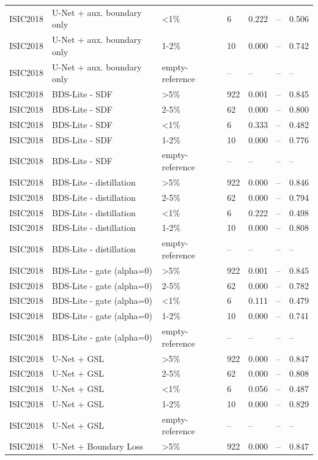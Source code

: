 \begin{longtable}{lllllll}
ISIC2018 & U-Net + aux. boundary only & <1\% & 6 & 0.222 & -- & 0.506 \\
ISIC2018 & U-Net + aux. boundary only & 1-2\% & 10 & 0.000 & -- & 0.742 \\
ISIC2018 & U-Net + aux. boundary only & empty-reference & -- & -- & -- & -- \\
ISIC2018 & BDS-Lite - SDF & >5\% & 922 & 0.001 & -- & 0.845 \\
ISIC2018 & BDS-Lite - SDF & 2-5\% & 62 & 0.000 & -- & 0.800 \\
ISIC2018 & BDS-Lite - SDF & <1\% & 6 & 0.333 & -- & 0.482 \\
ISIC2018 & BDS-Lite - SDF & 1-2\% & 10 & 0.000 & -- & 0.776 \\
ISIC2018 & BDS-Lite - SDF & empty-reference & -- & -- & -- & -- \\
ISIC2018 & BDS-Lite - distillation & >5\% & 922 & 0.000 & -- & 0.846 \\
ISIC2018 & BDS-Lite - distillation & 2-5\% & 62 & 0.000 & -- & 0.794 \\
ISIC2018 & BDS-Lite - distillation & <1\% & 6 & 0.222 & -- & 0.498 \\
ISIC2018 & BDS-Lite - distillation & 1-2\% & 10 & 0.000 & -- & 0.808 \\
ISIC2018 & BDS-Lite - distillation & empty-reference & -- & -- & -- & -- \\
ISIC2018 & BDS-Lite - gate (alpha=0) & >5\% & 922 & 0.001 & -- & 0.845 \\
ISIC2018 & BDS-Lite - gate (alpha=0) & 2-5\% & 62 & 0.000 & -- & 0.782 \\
ISIC2018 & BDS-Lite - gate (alpha=0) & <1\% & 6 & 0.111 & -- & 0.479 \\
ISIC2018 & BDS-Lite - gate (alpha=0) & 1-2\% & 10 & 0.000 & -- & 0.741 \\
ISIC2018 & BDS-Lite - gate (alpha=0) & empty-reference & -- & -- & -- & -- \\
ISIC2018 & U-Net + GSL & >5\% & 922 & 0.000 & -- & 0.847 \\
ISIC2018 & U-Net + GSL & 2-5\% & 62 & 0.000 & -- & 0.808 \\
ISIC2018 & U-Net + GSL & <1\% & 6 & 0.056 & -- & 0.487 \\
ISIC2018 & U-Net + GSL & 1-2\% & 10 & 0.000 & -- & 0.829 \\
ISIC2018 & U-Net + GSL & empty-reference & -- & -- & -- & -- \\
ISIC2018 & U-Net + Boundary Loss & >5\% & 922 & 0.000 & -- & 0.847 \\

\end{longtable}
